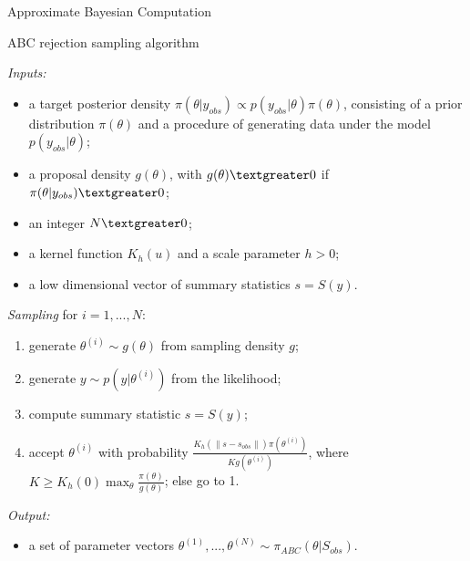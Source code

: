 \documentclass{beamer}
\begin{document}
\begin{section}{Approximate Bayesian Computation}

	\begin{frame}{ABC rejection sampling algorithm}

		 {
			\emph{Inputs:}
			\begin{itemize}
				\item a target posterior density $\pi(\theta | y_{obs}) \propto p(y_{obs}|\theta) \pi(\theta)$, consisting of a prior distribution $\pi(\theta)$ and a procedure of generating data under the model $p(y_{obs}|\theta)$;
				\item a proposal density $g(\theta)$, with $g(\theta)\textgreater 0 $ if $\pi(\theta | y_{obs}) \textgreater 0$;
				\item an integer $N \textgreater0$;
				\item a kernel function $K_h(u)$ and a scale parameter $h > 0$;
				\item a low dimensional vector of summary statistics $s=S(y)$.
			\end{itemize}
		}
		\only<2> {
			\emph{Sampling} for $i= 1,..., N$:
			\begin{enumerate}
				\item generate $\theta ^ {(i)} \sim g(\theta)$ from sampling density $g$;
				\item generate $ y \sim p(y|\theta ^ {(i)})$ from the likelihood;
				\item compute summary statistic $s = S(y)$;
				\item accept $\theta ^ {(i)}$ with probability $\frac{K_h(\parallel s-s_{obs}\parallel)   \pi(\theta ^ {(i)})}{K g(\theta ^ {(i)})}$, where $K \geq K_h(0)\max_{\theta}{\frac{\pi(\theta)}{g(\theta)}}$; else go to 1.
			\end{enumerate}
		
			\emph{Output:}
			\begin{itemize}
				\item a set of parameter vectors $\theta ^ {(1)},..., \theta ^ {(N)} \sim \pi_{ABC}(\theta |S_{obs})$.
			\end{itemize}
		}
		

	\end{frame}

	\begin{frame}{}
	\end{frame}

	\begin{frame}{}
	\end{frame}

	\begin{frame}{}
	\end{frame}



\end{section}
\end{document}
